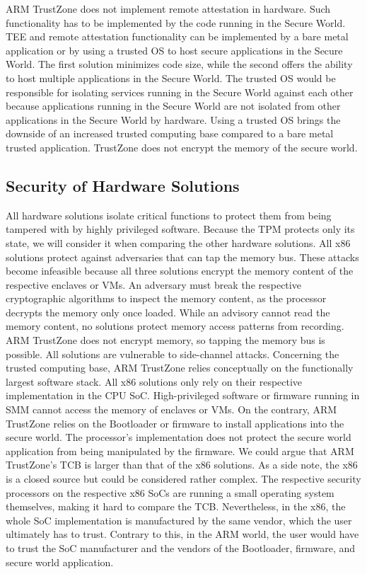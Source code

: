 ARM TrustZone does not implement remote attestation in hardware. Such functionality has to be implemented by the code
running in the Secure World. TEE and remote attestation functionality can be implemented by a bare metal application or
by using a trusted OS to host secure applications in the Secure World. The first solution minimizes code size, while the
second offers the ability
to host multiple applications in the Secure World. The trusted OS would be responsible for isolating services running
in the Secure World against each other because applications running in the Secure World are not isolated from other
applications in the Secure World by hardware. Using a trusted OS brings the downside of an increased trusted computing
base compared to a bare metal trusted application. TrustZone does not encrypt the memory of the secure world.

\subsection{Security of Hardware Solutions}
All hardware solutions isolate critical functions to protect them from being tampered with by highly
privileged software. Because the TPM protects only its state, we will consider it when comparing the other hardware
solutions. All x86 solutions protect against adversaries that can tap the memory bus. These attacks become infeasible
because all three solutions encrypt the memory content of the respective enclaves or VMs. An adversary must break the
respective cryptographic algorithms to inspect the memory content, as the processor decrypts the memory only once
loaded. While an advisory cannot read the memory content, no solutions protect memory access patterns from recording.
ARM TrustZone does not encrypt memory, so tapping the memory bus is possible. All solutions are vulnerable to
side-channel attacks. Concerning the trusted computing base, ARM TrustZone relies conceptually on the functionally
largest software stack. All x86 solutions only rely on their respective implementation in the CPU SoC. High-privileged
software or firmware running in SMM cannot access the memory of enclaves or VMs. On the contrary, ARM TrustZone
relies on the Bootloader or firmware to install applications into the secure world. The processor's implementation does
not protect the secure world application from being manipulated by the firmware. We could argue that ARM TrustZone's TCB
is larger than that of the x86 solutions. As a side note, the x86 is a closed source but could be considered rather
complex. The respective security processors on the respective x86 SoCs are running a small operating system themselves,
making it hard to compare the TCB. Nevertheless, in the x86, the whole SoC implementation is manufactured by the same
vendor, which the user ultimately has to trust. Contrary to this, in the ARM world, the user would have to trust the
SoC manufacturer and the vendors of the Bootloader, firmware, and secure world application.

